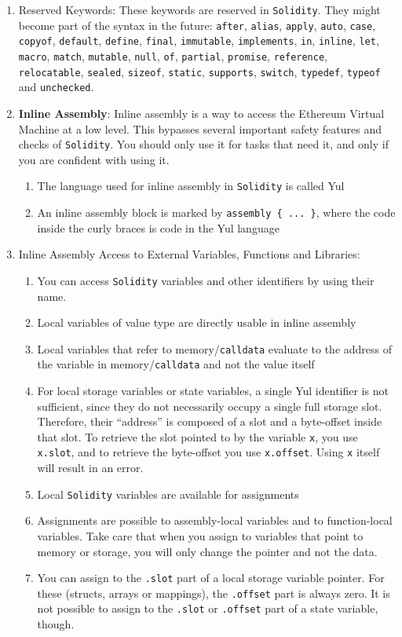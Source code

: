 \begin{enumerate}
\item Reserved Keywords: These keywords are reserved in \verb|Solidity|. They might become part of the syntax in the future: \verb|after|, \verb|alias|, \verb|apply|, \verb|auto|, \verb|case|, \verb|copyof|, \verb|default|, \verb|define|, \verb|final|, \verb|immutable|, \verb|implements|, \verb|in|, \verb|inline|, \verb|let|, \verb|macro|, \verb|match|, \verb|mutable|, \verb|null|, \verb|of|, \verb|partial|, \verb|promise|, \verb|reference|, \verb|relocatable|, \verb|sealed|, \verb|sizeof|, \verb|static|, \verb|supports|, \verb|switch|, \verb|typedef|, \verb|typeof| and \verb|unchecked|.

\item\textbf{Inline Assembly}: Inline assembly is a way to access the Ethereum Virtual Machine at a low level. This bypasses several important safety features and checks of \verb|Solidity|. You should only use it for tasks that need it, and only if you are confident with using it.
    \begin{enumerate}
	\item The language used for inline assembly in \verb|Solidity| is called Yul
	\item An inline assembly block is marked by \verb|assembly { ... }|, where the code inside the curly braces is code in the Yul language
    \end{enumerate}

\item Inline Assembly Access to External Variables, Functions and Libraries:
    \begin{enumerate}
	\item You can access \verb|Solidity| variables and other identifiers by using their name.
	\item Local variables of value type are directly usable in inline assembly
	\item Local variables that refer to memory/\verb|calldata| evaluate to the address of the variable in memory/\verb|calldata| and not the value itself
	\item For local storage variables or state variables, a single Yul identifier is not sufficient, since they do not necessarily occupy a single full storage slot. Therefore, their “address” is composed of a slot and a byte-offset inside that slot. To retrieve the slot pointed to by the variable \verb|x|, you use \verb|x.slot|, and to retrieve the byte-offset you use \verb|x.offset|. Using \verb|x| itself will result in an error.
	\item Local \verb|Solidity| variables are available for assignments
	\item Assignments are possible to assembly-local variables and to function-local variables. Take care that when you assign to variables that point to memory or storage, you will only change the pointer and not the data.
	\item You can assign to the \verb|.slot| part of a local storage variable pointer. For these (structs, arrays or mappings), the \verb|.offset| part is always zero. It is not possible to assign to the \verb|.slot| or \verb|.offset| part of a state variable, though.
\end{enumerate}


\end{enumerate}
